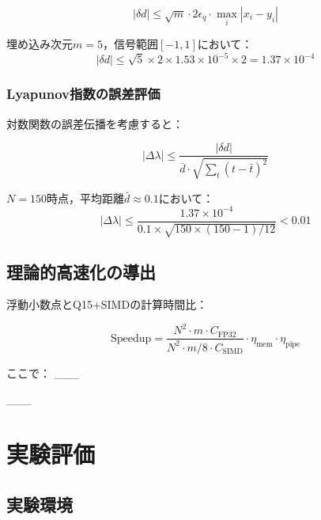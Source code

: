 \documentclass[paper]{ieice}
\begin{document}
\begin{equation}
|\delta d| \leq \sqrt{m} \cdot 2\epsilon_q \cdot \max_i |x_i - y_i|
\end{equation}

埋め込み次元$m=5$，信号範囲$[-1,1]$において：
\begin{equation}
|\delta d| \leq \sqrt{5} \times 2 \times 1.53 \times 10^{-5} \times 2 = 1.37 \times 10^{-4}
\end{equation}

\subsubsection{Lyapunov指数の誤差評価}
対数関数の誤差伝播を考慮すると：

\begin{equation}
|\Delta\lambda| \leq \frac{|\delta d|}{\bar{d} \cdot \sqrt{\sum_{t}(t - \bar{t})^2}}
\end{equation}

$N=150$時点，平均距離$\bar{d} \approx 0.1$において：
\begin{equation}
|\Delta\lambda| \leq \frac{1.37 \times 10^{-4}}{0.1 \times \sqrt{150 \times (150-1)/12}} < 0.01
\end{equation}

\subsection{理論的高速化の導出}

浮動小数点とQ15+SIMDの計算時間比：

\begin{equation}
\text{Speedup} = \frac{N^2 \cdot m \cdot C_{\text{FP32}}}{N^2 \cdot m/8 \cdot C_{\text{SIMD}}} \cdot \eta_{\text{mem}} \cdot \eta_{\text{pipe}}
\end{equation}

ここで：
___

___

\section{実験評価}

\subsection{実験環境}
\end{document}
